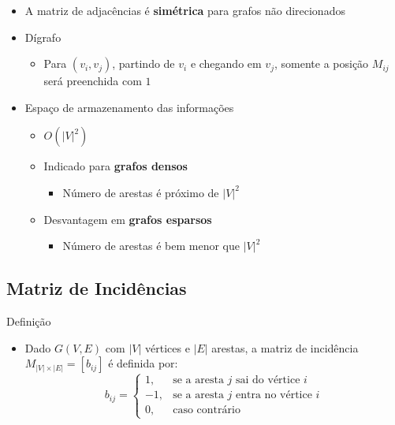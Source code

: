 \documentclass[xcolor=table]{beamer}
\begin{document}
\begin{frame}
  \begin{itemize}
    \item A matriz de adjacências é \textbf{simétrica} para grafos não direcionados
    \item Dígrafo
    \begin{itemize}
      \item Para $(v_i,v_j)$, partindo de $v_i$ e chegando em $v_j$, somente a posição $M_{ij}$ será preenchida com $1$
    \end{itemize}
    \item Espaço de armazenamento das informações
    \begin{itemize}
      \item $O(|V|^2)$
      \item Indicado para \textbf{grafos densos}
      \begin{itemize}
        \item Número de arestas é próximo de $|V|^2$
      \end{itemize}
      \item Desvantagem em \textbf{grafos esparsos}
      \begin{itemize}
        \item Número de arestas é bem menor que $|V|^2$
      \end{itemize}
    \end{itemize}
  \end{itemize}
\end{frame}

\subsection{Matriz de Incidências}
\begin{frame}
  \begin{block}{Definição}
    \begin{itemize}
      \item Dado $G(V,E)$ com $|V|$ vértices e $|E|$ arestas, a matriz de incidência $M_{|V|\times|E|} = [b_{ij}]$ é definida por:
      \begin{equation}
        b_{ij} =
        \begin{cases}
          1,  & \text{se a aresta } j \text{ sai do vértice } i \\
          -1, & \text{se a aresta } j \text{ entra no vértice } i \\
          0,  & \text{caso contrário}
        \end{cases}
      \end{equation}
    \end{itemize}
  \end{block}
\end{frame}
\end{document}
